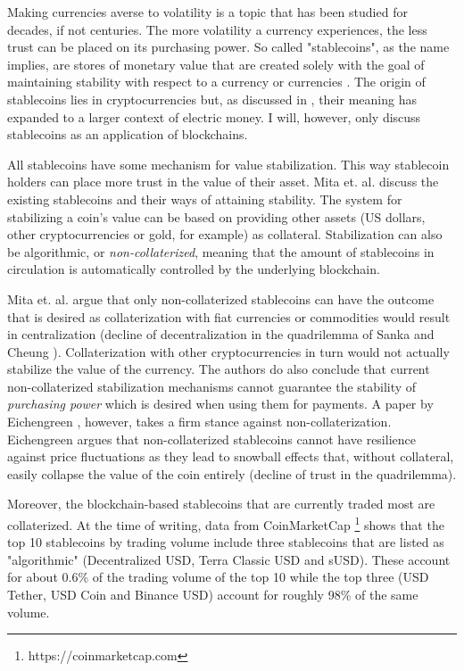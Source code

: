 Making currencies averse to volatility is a topic that has been
studied for decades, if not centuries. The more volatility a currency
experiences, the less trust can be placed on its purchasing power. So
called "stablecoins", as the name implies, are stores of monetary
value that are created solely with the goal of maintaining stability
with respect to a currency or currencies \cite{liptonTether}. The
origin of stablecoins lies in cryptocurrencies but, as discussed in
\cite{liptonTether}, their meaning has expanded to a larger context of
electric money. I will, however, only discuss stablecoins as an
application of blockchains.

All stablecoins have some mechanism for value stabilization. This way
stablecoin holders can place more trust in the value of their asset.
Mita et. al. \cite{mitaStablecoin} discuss the existing stablecoins
and their ways of attaining stability. The system for stabilizing a
coin's value can be based on providing other assets (US dollars, other
cryptocurrencies or gold, for example) as collateral. Stabilization
can also be algorithmic, or \textit{non-collaterized}, meaning that
the amount of stablecoins in circulation is automatically controlled
by the underlying blockchain. 

Mita et. al. argue that only non-collaterized stablecoins can have the
outcome that is desired as collaterization with fiat currencies or
commodities would result in centralization (decline of
decentralization in the quadrilemma of Sanka and Cheung
\cite{sankaScalability}). Collaterization with other cryptocurrencies
in turn would not actually stabilize the value of the currency. The
authors do also conclude that current non-collaterized stabilization
mechanisms cannot guarantee the stability of \textit{purchasing power}
which is desired when using them for payments. A paper by Eichengreen
\cite{eichengreenCommodity}, however, takes a firm stance against
non-collaterization. Eichengreen argues that non-collaterized
stablecoins cannot have resilience against price fluctuations as they
lead to snowball effects that, without collateral, easily collapse the
value of the coin entirely (decline of trust in the quadrilemma).

Moreover, the blockchain-based stablecoins that are currently traded
most are collaterized. At the time of writing, data from CoinMarketCap
\footnote{https://coinmarketcap.com} shows that the top 10 stablecoins
by trading volume include three stablecoins that are listed as
"algorithmic" (Decentralized USD, Terra Classic USD and sUSD). These
account for about 0.6\% of the trading volume of the top 10 while the
top three (USD Tether, USD Coin and Binance USD) account for roughly
98\% of the same volume.

